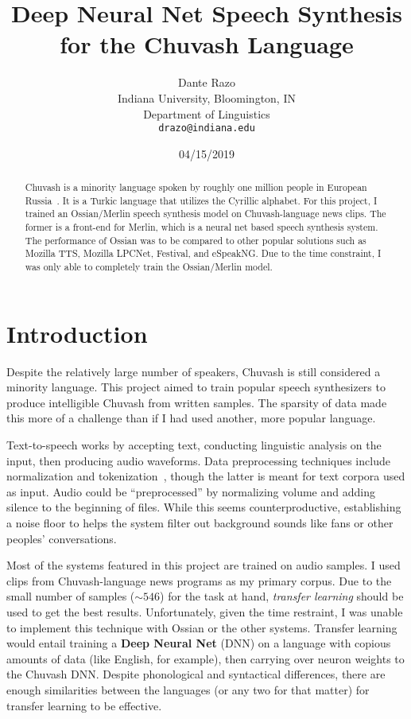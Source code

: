 \documentclass[11pt,a4paper]{article}
\title{Deep Neural Net Speech Synthesis for the Chuvash Language}
\author{Dante Razo \\
  Indiana University, Bloomington, IN \\
  Department of Linguistics \\
  {\tt drazo@indiana.edu} \\}
\date{04/15/2019}
\begin{document}
\maketitle
\graphicspath{{assets/}}
\begin{abstract}
  Chuvash is a minority language spoken by roughly one million people in European Russia~\cite{RBS:12}. It is a Turkic language that utilizes the Cyrillic alphabet. For this project, I trained an Ossian/Merlin speech synthesis model on Chuvash-language news clips. The former is a front-end for Merlin, which is a neural net based speech synthesis system. The performance of Ossian was to be compared to other popular solutions such as Mozilla TTS, Mozilla LPCNet, Festival, and eSpeakNG. Due to the time constraint, I was only able to completely train the Ossian/Merlin model.
\end{abstract}

\section{Introduction}\label{sect:intro}
Despite the relatively large number of speakers, Chuvash is still considered a minority language. This project aimed to train popular speech synthesizers to produce intelligible Chuvash from written samples. The sparsity of data made this more of a challenge than if I had used another, more popular language.

Text-to-speech works by accepting text, conducting linguistic analysis on the input, then producing audio waveforms. Data preprocessing techniques include normalization and tokenization~\cite{wiki-lexanalysis}, though the latter is meant for text corpora used as input. Audio could be ``preprocessed'' by normalizing volume and adding silence to the beginning of files. While this seems counterproductive, establishing a noise floor to helps the system filter out background sounds like fans or other peoples' conversations.

Most of the systems featured in this project are trained on audio samples. I used clips from Chuvash-language news programs as my primary corpus. Due to the small number of samples   ($\sim546$) for the task at hand, \textit{transfer learning} should be used to get the best results. Unfortunately, given the time restraint, I was unable to implement this technique with Ossian or the other systems. Transfer learning would entail training a \textbf{Deep Neural Net} (DNN) on a language with copious amounts of data (like English, for example), then carrying over neuron weights to the Chuvash DNN. Despite phonological and syntactical differences, there are enough similarities between the languages (or any two for that matter) for transfer learning to be effective.
\end{document}
